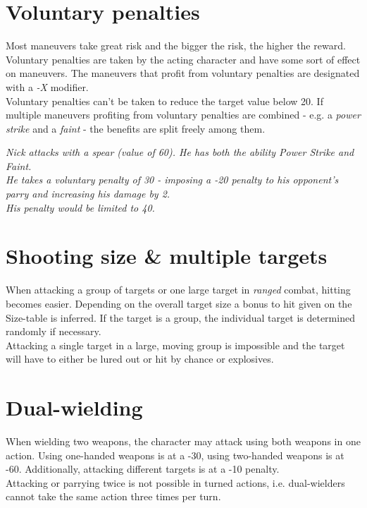 \section{Voluntary penalties}
Most maneuvers take great risk and the bigger the risk, the higher the reward. Voluntary penalties are taken by the acting character and have some sort of effect on maneuvers. The maneuvers that profit from voluntary penalties are designated with a \emph{-X} modifier.\\
Voluntary penalties can’t be taken to reduce the target value below 20. If multiple maneuvers profiting from voluntary penalties are combined - e.g. a \emph{power strike} and a \emph{faint} - the benefits are split freely among them.
\begin{exampleblock}
	\itshape
	Nick attacks with a spear (value of 60). He has both the ability Power Strike and Faint.\\
	He takes a voluntary penalty of 30 - imposing a -20 penalty to his opponent's parry and increasing his damage by 2.\\
	His penalty would be limited to 40.
\end{exampleblock}

\section{Shooting size \& multiple targets}
When attacking a group of targets or one large target in \emph{ranged} combat, hitting becomes easier. Depending on the overall target size a bonus to hit given on the Size-table is inferred. If the target is a group, the individual target is determined randomly if necessary.\\
Attacking a single target in a large, moving group is impossible and the target will have to either be lured out or hit by chance or explosives.
\section{Dual-wielding}
When wielding two weapons, the character may attack using both weapons in one action. Using one-handed weapons is at a -30, using two-handed weapons is at -60. Additionally, attacking different targets is at a -10 penalty.\\
Attacking or parrying twice is not possible in turned actions, i.e. dual-wielders cannot take the same action three times per turn.
